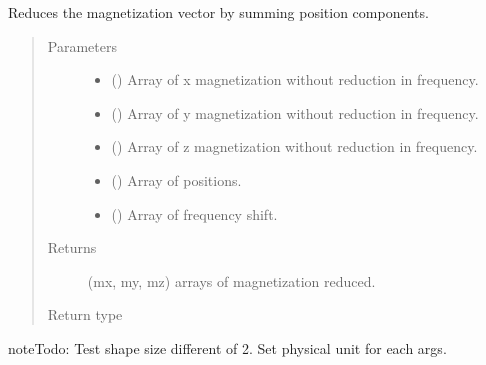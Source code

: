 \documentclass[a4paper,10pt,english]{sphinxmanual}
\begin{document}

\begin{fulllineitems}
\label{\detokenize{autodoc/mrsprint/mrsprint.simulator:mrsprint.simulator.reduce_magnetization_in_position}}
Reduces the magnetization vector by summing position components.
\begin{quote}\begin{description}
\item[{Parameters}] \leavevmode\begin{itemize}
\item {} 
 () \textendash{} Array of x magnetization without reduction in frequency.

\item {} 
 () \textendash{} Array of y magnetization without reduction in frequency.

\item {} 
 () \textendash{} Array of z magnetization without reduction in frequency.

\item {} 
 () \textendash{} Array of positions.

\item {} 
 () \textendash{} Array of frequency shift.

\end{itemize}

\item[{Returns}] \leavevmode
(mx, my, mz) arrays of magnetization reduced.

\item[{Return type}] \leavevmode
{}

\end{description}\end{quote}

\begin{sphinxadmonition}{note}{\label{autodoc/mrsprint/mrsprint.simulator:index-5}Todo:}
Test shape size different of 2.
Set physical unit for each args.
\end{sphinxadmonition}

\end{fulllineitems}
\end{document}

